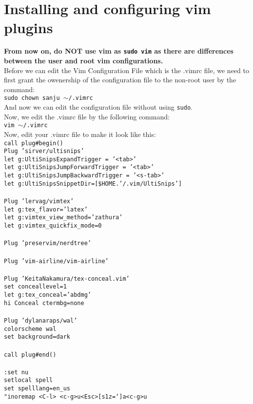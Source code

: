 \documentclass[11pt]{article}
\theoremstyle{plain}%
\theoremstyle{definition}
\theoremstyle{remark}
\begin{document}
	\section{Installing and configuring vim plugins}
	\textbf{From now on, do NOT use vim as \texttt{sudo vim} as there are differences between the user and root vim configurations.} \\
	Before we can edit the Vim Configuration File which is the .vimrc file, we need to first grant the owenership of the configuration file to the non-root user by the command: \\
	\texttt{sudo chown sanju $\sim$/.vimrc}\\
	And now we can edit the configuration file without using \texttt{sudo}.\\
	Now, we edit the .vimrc file by the following command: \\
	\texttt{vim $\sim$/.vimrc}\\
	Now, edit your .vimrc file to make it look like this: \\
	\texttt{call plug\#begin() \\
	Plug 'sirver/ultisnips' \\
	    let g:UltiSnipsExpandTrigger = '<tab>' \\
	    let g:UltiSnipsJumpForwardTrigger = '<tab>' \\
	    let g:UltiSnipsJumpBackwardTrigger = '<s-tab>'\\
	    let g:UltiSnipsSnippetDir=[\$HOME.'/.vim/UltiSnips'] \\
	\\
	Plug 'lervag/vimtex' \\
	    let g:tex\_flavor='latex' \\
	    let g:vimtex\_view\_method='zathura'\\
	    let g:vimtex\_quickfix\_mode=0\\
	\\
	Plug 'preservim/nerdtree'\\
	\\
	Plug 'vim-airline/vim-airline'\\
	\\
	Plug 'KeitaNakamura/tex-conceal.vim'\\
	    set conceallevel=1\\
	    let g:tex\_conceal='abdmg'\\
	    hi Conceal ctermbg=none\\
	\\
	Plug 'dylanaraps/wal'\\
	colorscheme wal\\
	set background=dark\\
	\\
	call plug\#end()\\
	\\
	:set nu \\
	setlocal spell\\
	set spelllang=en\_us\\
	"inoremap <C-l> <c-g>u<Esc>[s1z=`]a<c-g>u}\\
\end{document}
